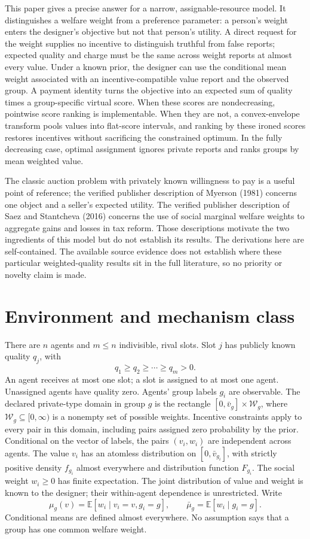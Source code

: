 \documentclass[11pt]{article}
\newcommand{\E}{\mathbb E}
\begin{document}
This paper gives a precise answer for a narrow, assignable-resource model. It distinguishes a welfare weight from a preference parameter: a person's weight enters the designer's objective but not that person's utility. A direct request for the weight supplies no incentive to distinguish truthful from false reports; expected quality and charge must be the same across weight reports at almost every value. Under a known prior, the designer can use the conditional mean weight associated with an incentive-compatible value report and the observed group. A payment identity turns the objective into an expected sum of quality times a group-specific virtual score. When these scores are nondecreasing, pointwise score ranking is implementable. When they are not, a convex-envelope transform pools values into flat-score intervals, and ranking by these ironed scores restores incentives without sacrificing the constrained optimum. In the fully decreasing case, optimal assignment ignores private reports and ranks groups by mean weighted value.

The classic auction problem with privately known willingness to pay is a useful point of reference; the verified publisher description of Myerson (1981) concerns one object and a seller's expected utility. The verified publisher description of Saez and Stantcheva (2016) concerns the use of social marginal welfare weights to aggregate gains and losses in tax reform. Those descriptions motivate the two ingredients of this model but do not establish its results. The derivations here are self-contained. The available source evidence does not establish where these particular weighted-quality results sit in the full literature, so no priority or novelty claim is made.

\section{Environment and mechanism class}\label{sec:model}

There are $n$ agents and $m\le n$ indivisible, rival slots. Slot $j$ has publicly known quality $q_j$, with
\[
q_1\ge q_2\ge\cdots\ge q_m>0.
\]
An agent receives at most one slot; a slot is assigned to at most one agent. Unassigned agents have quality zero. Agents' group labels $g_i$ are observable. The declared private-type domain in group $g$ is the rectangle $[0,\bar v_g]\times\mathcal W_g$, where $\mathcal W_g\subseteq[0,\infty)$ is a nonempty set of possible weights. Incentive constraints apply to every pair in this domain, including pairs assigned zero probability by the prior. Conditional on the vector of labels, the pairs $(v_i,w_i)$ are independent across agents. The value $v_i$ has an atomless distribution on $[0,\bar v_{g_i}]$, with strictly positive density $f_{g_i}$ almost everywhere and distribution function $F_{g_i}$. The social weight $w_i\ge0$ has finite expectation. The joint distribution of value and weight is known to the designer; their within-agent dependence is unrestricted. Write
\[
\mu_g(v)=\E[w_i\mid v_i=v,g_i=g],\qquad
\bar\mu_g=\E[w_i\mid g_i=g].
\]
Conditional means are defined almost everywhere. No assumption says that a group has one common welfare weight.
\end{document}

